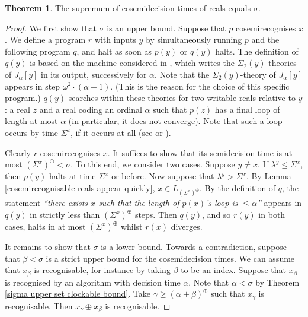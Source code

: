 \documentclass[a4paper,11pt]{amsart}
\theoremstyle{definition}
\newtheorem{theorem}[fact]{Theorem}
\newtheorem*{problem A}{Problem 1}
\newtheorem*{problem B}{Problem 2}
\theoremstyle{remark}
\begin{document}
\begin{theorem} 
\label{supremum of cosemidecision times of reals} 
The supremum of cosemidecision times of 
reals equals $\sigma$. 
\end{theorem} 
\begin{proof} 
We first show that $\sigma$ is an upper bound. 
Suppose that $p$ cosemirecognises $x$. 
We define a program $r$ with inputs $y$ by simultaneously running $p$ and the following program $q$, and halt as soon as $p(y)$ or $q(y)$ halts. 
The definition of $q(y)$ is based on the machine considered in \cite{friedman2007two}, 
which writes the $\Sigma_2(y)$-theories of $J_\alpha[y]$ in its output, successively for $\alpha$. 
Note that the $\Sigma_2(y)$-theory of $J_\alpha[y]$ appears in step 
 $\omega^2\cdot (\alpha +1)$. 
 (This is the reason for the choice of this specific program.)  
$q(y)$ searches within these theories for two writable reals relative to $y$: a real $z$ and a real coding an ordinal $\alpha$ such that $p(z)$ has a final loop of length at most $\alpha$ (in particular, it does not converge). 
Note that such a loop occurs by time $\Sigma^z$, if it occurs at all (see \cite[Main Proposition]{welch2000length} or \cite[Lemma 2]{welch2009characteristics}). 

Clearly $r$ cosemirecognises $x$. 
It suffices to show that its semidecision time is at most $(\Sigma^x)^{\oplus}<\sigma$. 
To this end, we consider two cases. Suppose $y\neq
x$. If $\lambda^y\leq\Sigma^x$, then $p(y)$ halts at time $\Sigma^x$ or before. 
Now suppose that $\lambda^y>\Sigma^x$. 
By Lemma \ref{cosemirecognisable reals appear quickly}, $x\in L_{(\Sigma^x)^\oplus}$. 
By the definition of $q$, the statement \emph{``there exists $x$ such that the length of $p(x)$'s loop is  $\leq \alpha$''} appears in $q(y)$ in strictly less than $(\Sigma^x)^\oplus$ steps. Then $q(y)$, and so $r(y)$ in both cases, halts in at most $(\Sigma^x)^{\oplus}$ whilst $r(x)$ diverges.


It remains to show that $\sigma$ is a lower bound. 
Towards a contradiction, suppose that $\beta<\sigma$ is a strict upper bound for the cosemidecision times. 
We can assume that $x_\beta$ is recognisable, for instance by taking $\beta$ to be an index. 
Suppose that $x_\beta$ is recognised by an algorithm with decision time $\alpha$. 
Note that $\alpha<\sigma$ by Theorem \ref{sigma upper set clockable bound}. 
Take $\gamma\geq (\alpha+\beta)^\oplus$ such that $x_\gamma$ is recognisable. 
Then $x_\gamma\oplus x_\beta$ is recognisable. 



\end{proof}
\end{document}
